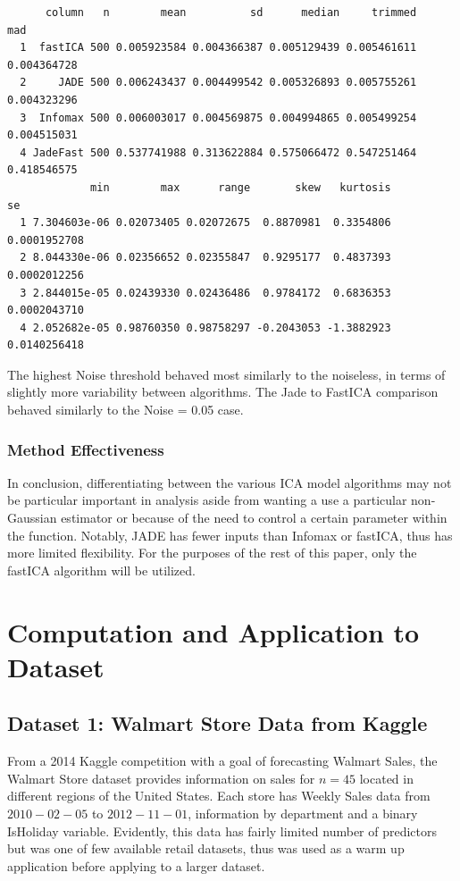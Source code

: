 \documentclass[12pt,twoside]{amherstthesis}
\begin{document}
  \begin{verbatim}
      column   n        mean          sd      median     trimmed         mad
  1  fastICA 500 0.005923584 0.004366387 0.005129439 0.005461611 0.004364728
  2     JADE 500 0.006243437 0.004499542 0.005326893 0.005755261 0.004323296
  3  Infomax 500 0.006003017 0.004569875 0.004994865 0.005499254 0.004515031
  4 JadeFast 500 0.537741988 0.313622884 0.575066472 0.547251464 0.418546575
             min        max      range       skew   kurtosis           se
  1 7.304603e-06 0.02073405 0.02072675  0.8870981  0.3354806 0.0001952708
  2 8.044330e-06 0.02356652 0.02355847  0.9295177  0.4837393 0.0002012256
  3 2.844015e-05 0.02439330 0.02436486  0.9784172  0.6836353 0.0002043710
  4 2.052682e-05 0.98760350 0.98758297 -0.2043053 -1.3882923 0.0140256418
  \end{verbatim}
  
  The highest Noise threshold behaved most similarly to the noiseless, in
  terms of slightly more variability between algorithms. The Jade to
  FastICA comparison behaved similarly to the Noise = 0.05 case.
  
  \subsection{Method Effectiveness}\label{method-effectiveness}
  
  In conclusion, differentiating between the various ICA model algorithms
  may not be particular important in analysis aside from wanting a use a
  particular non-Gaussian estimator or because of the need to control a
  certain parameter within the function. Notably, JADE has fewer inputs
  than Infomax or fastICA, thus has more limited flexibility. For the
  purposes of the rest of this paper, only the fastICA algorithm will be
  utilized.
  
  \chapter{Computation and Application to
  Dataset}\label{computation-and-application-to-dataset}
  
  \section{Dataset 1: Walmart Store Data from
  Kaggle}\label{dataset-1-walmart-store-data-from-kaggle}
  
  From a 2014 Kaggle competition with a goal of forecasting Walmart Sales,
  the Walmart Store dataset provides information on sales for \(n=45\)
  located in different regions of the United States. Each store has Weekly
  Sales data from \(2010-02-05\) to \(2012-11-01\), information by
  department and a binary IsHoliday variable. Evidently, this data has
  fairly limited number of predictors but was one of few available retail
  datasets, thus was used as a warm up application before applying to a
  larger dataset.
  
\end{document}
